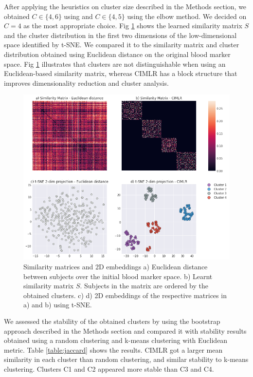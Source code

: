 After applying the heuristics on cluster size described in the Methods section, we obtained $C\in\{4,6\}$ using  \cite{Zelnik-Manor} and $C\in\{4,5\}$ using the elbow method. We decided on $C=4$ as the most appropriate choice. Fig \ref{figclusters} shows the learned similarity matrix $S$ and the cluster distribution in the first two dimensions of the low-dimensional space identified by t-SNE. We compared it to the similarity matrix and cluster distribution obtained using Euclidean distance on the original blood marker space. Fig \ref{figclusters} illustrates that clusters are not distinguishable when using an Euclidean-based similarity matrix, whereas CIMLR has a block structure that improves dimensionality reduction and cluster analysis. \\

\begin{figure}[!htbp]
  \centering
\includegraphics[width=1.0\textwidth]{figures/cimlr/cluster_results_full.png}
\caption[Similarity matrices and 2D embeddings.]{Similarity matrices and 2D embeddings a) Euclidean distance between subjects over the initial blood marker space. b) Learnt similarity matrix $S$. Subjects in the matrix are ordered by the obtained clusters. c) d) 2D embeddings of the respective matrices in a) and b) using t-SNE.}
\label{figclusters}
\end{figure}

We assessed the stability of the obtained clusters by using the bootstrap approach described in the Methods section and compared it with stability results obtained using a random clustering and k-means clustering with Euclidean metric. Table \ref{table:jaccard} shows the results. CIMLR got a larger mean similarity in each cluster than random clustering, and similar stability to k-means clustering. Clusters C1 and C2 appeared more stable than C3 and C4. \\


